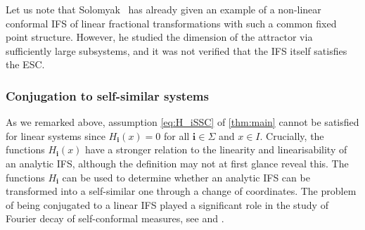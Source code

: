 \documentclass[11pt,]{article}
\def\cref#1{\ref{#1}}%
\theoremstyle{definition}
\theoremstyle{remark}
\newcommand{\0}{\mathbf{0}}
\newcommand{\bi}{\mathbf{i}}
\begin{document}
Let us note that Solomyak~\cite{Solomyak24} has already given an example of a non-linear conformal
IFS of linear fractional transformations with such a common fixed point structure.
However, he studied the dimension of the attractor via sufficiently large subsystems, and it was not
verified that the IFS itself satisfies the ESC.


%
%
%
%



\subsubsection{Conjugation to self-similar systems}\label{sec:ConjLinSys}
As we remarked above, assumption \eqref{eq:H_iSSC} of \cref{thm:main} cannot be satisfied for linear
systems since $H_{\bi}(x)=0$ for all $\bi\in \Sigma$ and $x \in I$.  Crucially, the functions
$H_{\bi}(x)$ have a stronger relation to the linearity and linearisability of an analytic IFS,
although the definition may not at first glance reveal this.  The functions $H_{\bi}$ can be used to
determine whether an analytic IFS can be transformed into a
self-similar one through a change of coordinates.
The problem of being conjugated to a linear IFS played a significant role in the study of Fourier
decay of self-conformal measures, see
\cite{AlgomEtal_LogFourierDecaySelfConf_JLMS,BakerBanaji_PolyFourierDecay} and \cite[Corollary 1.2 part
3.]{AlgomEtal_PointwiseNormalityFDecaySelfSonf_AdvMath21}.
\end{document}
